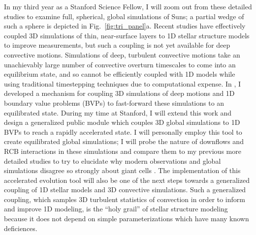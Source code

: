 \documentclass[onecolumn, 11pt, hmargin=1in, vmargin=1in]{aastex62}
\begin{document}
In my third year as a Stanford Science Fellow, I will zoom out from these detailed studies to examine full, spherical, global simulations of Suns; a partial wedge of such a sphere is depicted in Fig.~\ref{fig:tri_panel}a.
Recent studies \citep{jorgensen&weiss2019} have effectively coupled 3D simulations of thin, near-surface layers to 1D stellar structure models to improve measurements, but such a coupling is not yet available for deep convective motions.
Simulations of deep, turbulent convective motions take an unachievably large number of convective overturn timescales to come into an equilibrium state, and so cannot be efficiently coupled with 1D models while using traditional timestepping techniques due to computational expense.
In \citet{anders&all2018}, I developed a mechanism for coupling 3D simulations of deep motions and 1D boundary value problems (BVPs) to fast-forward these simulations to an equilibrated state.
During my time at Stanford, I will extend this work and design a generalized public module which couples 3D global simulations to 1D BVPs to reach a rapidly accelerated state.
I will personally employ this tool to create equilibrated global simulations; I will probe the nature of downflows and RCB interactions in these simulations and compare them to my previous more detailed studies to try to elucidate why modern observations and global simulations disagree so strongly about giant cells \citep{hanasoge&all2015}.
The implementation of this accelerated evolution tool will also be one of the next steps towards a generalized coupling of 1D stellar models and 3D convective simulations.
Such a generalized coupling, which samples 3D turbulent statistics of convection in order to inform and improve 1D modeling, is the ``holy grail'' of stellar structure modeling because it does not depend on simple parameterizations which have many known deficiences.
\end{document}
